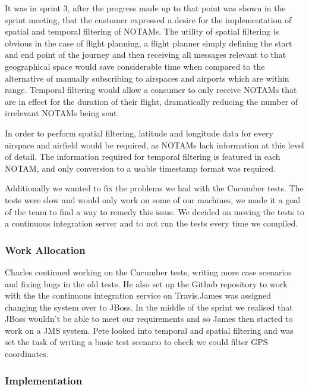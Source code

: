 \documentclass[a4paper, 12pt]{article}
\begin{document}
It was in sprint 3, after the progress made up to that point was shown in the sprint meeting, that the customer expressed a desire for the implementation of spatial and temporal filtering of NOTAMs. The utility of spatial filtering is obvious in the case of flight planning, a flight planner simply defining the start and end point of the journey and then receiving all messages relevant to that geographical space would save considerable time when compared to the alternative of manually subscribing to airspaces and airports which are within range. Temporal filtering would allow a consumer to only receive NOTAMs that are in effect for the duration of their flight, dramatically reducing the number of irrelevant NOTAMs being sent.

In order to perform spatial filtering, latitude and longitude data for every airspace and airfield would be required, as NOTAMs lack information at this level of detail. The information required for temporal filtering is featured in each NOTAM, and only conversion to a usable timestamp format was required.

Additionally we wanted to fix the problems we had with the Cucumber tests. The tests were slow and would only work on some of our machines, we made it a goal of the team to find a way to remedy this issue. We decided on moving the tests to a continuous integration server and to not run the tests every time we compiled.

\subsubsection{Work Allocation}

Charles continued working on the Cucumber tests, writing more case scenarios and fixing bugs in the old tests. He also set up the Github repository to work with the the continuous integration service on Travis.James was assigned changing the system over to JBoss. In the middle of the sprint we realised that JBoss wouldn't be able to meet our requirements and so James then started to work on a JMS system. Pete looked into temporal and spatial filtering and was set the task of writing a basic test scenario to check we could filter GPS coordinates.

\subsubsection{Implementation}
\end{document}
